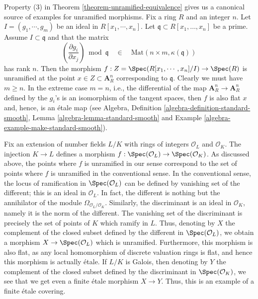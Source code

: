 \begin{example}
\label{example-standard-etale}
Property (3) in
Theorem \ref{theorem-unramified-equivalence}
gives us a canonical source of examples for unramified morphisms.
Fix a ring $R$ and an integer $n$. Let $I = (g_1, \cdots, g_m)$ be an
ideal in $R[x_1, \cdots, x_n]$. Let $\mathfrak q \subset R[x_1, \ldots, x_n]$
be a prime. Assume $I \subset \mathfrak q$ and that the matrix
$$
\left(\frac{\partial g_i}{\partial x_j}\right) \bmod \mathfrak q
\quad\in\quad
\text{Mat}(n \times m, \kappa(\mathfrak q))
$$
has rank $n$. Then the morphism
$f : Z = \Spec(R[x_1, \cdots, x_n]/I) \to \Spec(R)$
is unramified at the point $x \in Z \subset \mathbf{A}^n_R$ corresponding
to $\mathfrak q$. Clearly we must have $m \geq n$.
In the extreme case $m = n$, i.e., the differential of the map
$\mathbf{A}^n_R \to \mathbf{A}^n_R$ defined by the $g_i$'s
is an isomorphism of the tangent spaces, then $f$ is also flat
$x$ and, hence, is an \'etale map (see Algebra,
Definition \ref{algebra-definition-standard-smooth},
Lemma \ref{algebra-lemma-standard-smooth} and
Example \ref{algebra-example-make-standard-smooth}).
\end{example}

\begin{example}
\label{example-number-theory-etale}
Fix an extension of number fields $L/K$ with rings of integers
$\mathcal{O}_L$ and $\mathcal{O}_K$. The injection $K \to L$ defines a
morphism $f : \Spec(\mathcal{O}_L) \to \Spec(\mathcal{O}_K)$.
As discussed above, the points where $f$ is unramified in our sense
correspond to the set of points where $f$ is unramified in the conventional
sense. In the conventional sense, the locus of ramification in
$\Spec(\mathcal{O}_L)$ can be defined by vanishing set of the
different; this is an ideal in $\mathcal{O}_L$. In fact, the different is
nothing but the annihilator of the module
$\Omega_{\mathcal{O}_L/\mathcal{O}_K}$. Similarly, the
discriminant is an ideal in $\mathcal{O}_K$, namely it is the
norm of the different.
The vanishing set of the discriminant is precisely the set
of points of $K$ which ramify in $L$.
Thus, denoting by $X$ the complement of the closed subset
defined by the different in $\Spec(\mathcal{O}_L)$,
we obtain a morphism $X \to \Spec(\mathcal{O}_L)$ which is unramified.
Furthermore, this morphism is also flat, as any local homomorphism
of discrete valuation rings is flat, and hence this morphism is
actually \'etale. If $L/K$ is Galois, then denoting by
$Y$ the complement of the closed subset defined by the discriminant in
$\Spec(\mathcal{O}_K)$, we see that we get even a
finite \'etale morphism $X \to Y$.
Thus, this is an example of a finite \'etale covering.
\end{example}





